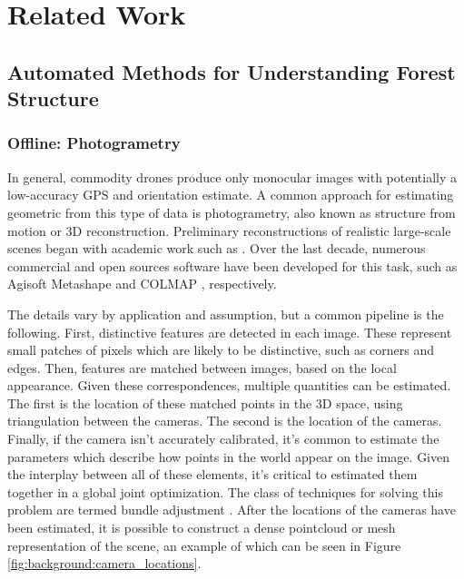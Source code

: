 
\chapter{Related Work} \label{chapRelated}


\section{Automated Methods for Understanding Forest Structure}
\subsection{Offline: Photogrametry}
In general, commodity drones produce only monocular images with potentially a low-accuracy GPS and orientation estimate. A common approach for estimating geometric from this type of data is photogrametry, also known as structure from motion or 3D reconstruction.  Preliminary reconstructions of realistic large-scale scenes began with academic work such as \cite{Agarwal2009}. Over the last decade, numerous commercial and open sources software have been developed for this task, such as Agisoft Metashape \cite{AgisoftMetashape} and COLMAP \cite{schoenberger2016mvs, schoenberger2016sfm}, respectively.

The details vary by application and assumption, but a common pipeline is the following. First, distinctive features are detected in each image. These represent small patches of pixels which are likely to be distinctive, such as corners and edges. Then, features are matched between images, based on the local appearance. 
Given these correspondences, multiple quantities can be estimated. The first is the location of these matched points in the 3D space, using triangulation between the cameras. The second is the location of the cameras. Finally, if the camera isn't accurately calibrated, it's common to estimate the parameters which describe how points in the world appear on the image. Given the interplay between all of these elements, it's critical to estimated them together in a global joint optimization. The class of techniques for solving this problem are termed bundle adjustment \cite{Triggs2000BundleSynthesis}. After the locations of the cameras have been estimated, it is possible to construct a dense pointcloud or mesh representation of the scene, an example of which can be seen in Figure \ref{fig:background:camera_locations}.

